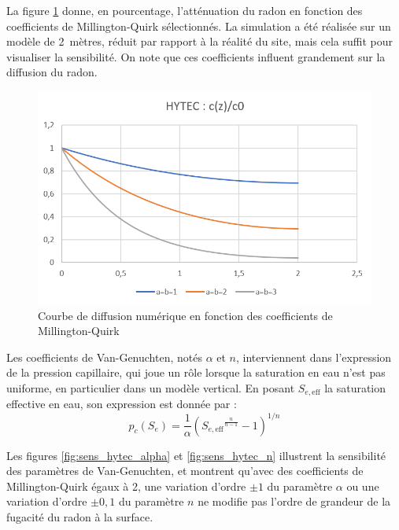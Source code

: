 \documentclass{article}
\begin{document}
La figure \ref{fig:sens_hytec_mq} donne, en pourcentage, l'atténuation du radon en fonction des coefficients de Millington-Quirk sélectionnés. La simulation a été réalisée sur un modèle de 2~mètres, réduit par rapport à la réalité du site, mais cela suffit pour visualiser la sensibilité. On note que ces coefficients influent grandement sur la diffusion du radon.

\begin{figure}[H]
    \centering
    \includegraphics[height = 0.3 \textheight]{III_C_10.png}
    \caption{Courbe de diffusion numérique en fonction des coefficients de Millington-Quirk}
    \label{fig:sens_hytec_mq}
\end{figure}

Les coefficients de Van-Genuchten, notés $\alpha$ et $n$, interviennent dans l’expression de la pression capillaire, qui joue un rôle lorsque la saturation en eau n’est pas uniforme, en particulier dans un modèle vertical. En posant $S_{e,\text{eff}}$ la saturation effective en eau, son expression est donnée par :
$$
p_c (S_e)= \dfrac{1}{\alpha} \left( {S_{e,\text{eff}} }^{\frac{n}{n-1}} -1 \right)^{1/n}
$$

Les figures \ref{fig:sens_hytec_alpha} et \ref{fig:sens_hytec_n} illustrent la sensibilité des paramètres de Van-Genuchten, et montrent qu'avec des coefficients de Millington-Quirk égaux à 2, une variation d’ordre $\pm 1$ du paramètre $\alpha$ ou une variation d’ordre $\pm 0,1$ du paramètre $n$ ne modifie pas l’ordre de grandeur de la fugacité du radon à la surface.
\end{document}
